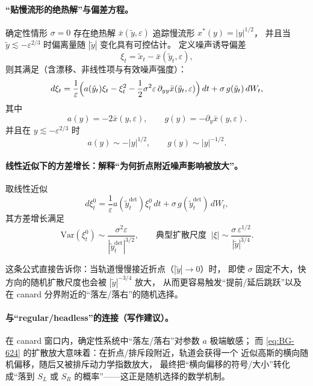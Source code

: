 	\paragraph{“贴慢流形的绝热解”与偏差方程。}
	确定性情形 $\sigma=0$ 存在绝热解 $\bar x(\tilde y,\varepsilon)$ 追踪慢流形 $x^\ast(y)=|y|^{1/2}$，
	并且当 $\tilde y\lesssim -\varepsilon^{2/3}$ 时偏离量随 $|\tilde y|$ 变化具有可控估计。
	定义噪声诱导偏差
	\[
	\xi_t=\tilde x_t-\bar x(\tilde y_t,\varepsilon),
	\]
	则其满足（含漂移、非线性项与有效噪声强度）：
	\begin{equation}\label{eq:BG-621}
		d\xi_t=\frac{1}{\varepsilon}\Bigl(a(\tilde y_t)\xi_t-\xi_t^2-\frac{1}{2}\sigma^2\varepsilon\,\partial_{yy}\bar x(\tilde y_t,\varepsilon)\Bigr)\,dt
		+\sigma\,g(\tilde y_t)\,dW_t,
	\end{equation}
	其中
	\begin{equation}\label{eq:BG-622-623}
		a(y)=-2\bar x(y,\varepsilon),\qquad g(y)=-\partial_y\bar x(y,\varepsilon).
	\end{equation}
	并且在 $y\lesssim -\varepsilon^{2/3}$ 时
	\[
	a(y)\sim -|y|^{1/2},\qquad g(y)\sim |y|^{-1/2}.
	\]
	
	\paragraph{线性近似下的方差增长：解释“为何折点附近噪声影响被放大”。}
	取线性近似
	\begin{equation}\label{eq:BG-624}
		d\xi^{0}_t=\frac{1}{\varepsilon}a(\tilde y^{\mathrm{det}}_t)\xi^{0}_t\,dt+\sigma\,g(\tilde y^{\mathrm{det}}_t)\,dW_t,
	\end{equation}
	其方差增长满足
	\[
	\mathrm{Var}(\xi^{0}_t)\sim \frac{\sigma^2\varepsilon}{|\tilde y^{\mathrm{det}}_t|^{3/2}},
	\qquad
	\text{典型扩散尺度 }\ |\xi|\sim \frac{\sigma\,\varepsilon^{1/2}}{|\tilde y|^{3/4}}.
	\]
	
	这条公式直接告诉你：当轨道慢慢接近折点（$|\tilde y|\to0$）时，
	即使 $\sigma$ 固定不大，快方向的随机扩散尺度也会被 $|\tilde y|^{-3/4}$ 放大，
	从而更容易触发“提前/延后跳跃”以及在 canard 分界附近的“落左/落右”的随机选择。
	
	\paragraph{与“regular/headless”的连接（写作建议）。}
	在 canard 窗口内，确定性系统中“落左/落右”对参数 $a$ 极端敏感；
	而 \eqref{eq:BG-624} 的扩散放大意味着：在折点/排斥段附近，轨道会获得一个
	近似高斯的横向随机偏移，随后又被排斥动力学指数放大，
	最终把“横向偏移的符号/大小”转化成“落到 $S_L$ 或 $S_R$ 的概率”——这正是随机选择的数学机制。
	
